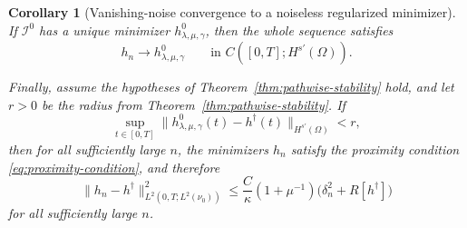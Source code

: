 \documentclass{article}
\newtheorem{corollary}[theorem]{Corollary}
\theoremstyle{definition}
\begin{document}
\begin{corollary}[Vanishing-noise convergence to a noiseless regularized minimizer]
    If \(\mathcal I^0\) has a unique minimizer \(h^0_{\lambda,\mu,\gamma}\), then the whole sequence
    satisfies
    \[
        h_n\to h^0_{\lambda,\mu,\gamma}
        \qquad\text{in } C([0,T];H^{s'}(\Omega)).
    \]

    Finally, assume the hypotheses of Theorem~\ref{thm:pathwise-stability} hold, and let \(r>0\) be
    the radius from Theorem~\ref{thm:pathwise-stability}. If
    \[
        \sup_{t\in[0,T]}
        \|h^0_{\lambda,\mu,\gamma}(t)-h^\dagger(t)\|_{H^{s'}(\Omega)}<r,
    \]
    then for all sufficiently large \(n\), the minimizers \(h_n\) satisfy the proximity condition
    \eqref{eq:proximity-condition}, and therefore
    \[
        \|h_n-h^\dagger\|_{L^2(0,T;L^2(\nu_0))}^2
        \le
        \frac{C}{\kappa}(1+\mu^{-1})
        \bigl(\delta_n^2+R[h^\dagger]\bigr)
    \]
    for all sufficiently large \(n\).
\end{corollary}
\end{document}
